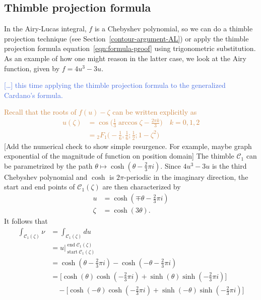 \documentclass{article}
\theoremstyle{definition}
\theoremstyle{plain}
\newenvironment{todo}{\color{Coral}}{\color{black}}
\newenvironment{old}{\color{RoyalBlue}}{\color{black}}
\begin{document}
\begin{old}
\subsection{Thimble projection formula}

In the Airy-Lucas integral, $f$ is a Chebyshev polynomial, so we can do a thimble projection technique (see Section~\ref{contour-argument-AL}) or apply the thimble projection formula equation~\eqref{eqn:formula-proof} using trigonometric substitution. As an example of how one might reason in the latter case, we look at the Airy function, given by $f = 4u^3-3u$.

\textcolor{RoyalBlue}{[\ldots] this time applying the thimble projection formula to the generalized Cardano's formula.}

\textcolor{Peru}{Recall that the roots of $f(u)-\zeta$ can be written explicitly as 
\begin{align*}
    u(\zeta)&=\cos\Big(\frac{1}{3}\arccos\zeta-\frac{2\pi k}{3}\Big) \quad k=0,1,2\\
    &={}_2F_1\Big(-\frac{1}{6},\frac{1}{6};\frac{1}{2};1-\zeta^2\Big)
\end{align*}}
\begin{todo}[Add the numerical check to show simple resurgence. For example, maybe graph exponential of the magnitude of function on position domain]\end{todo}
The thimble $\mathcal{C}_1$ can be parametrized by the path $\theta \mapsto \cosh(\theta - \tfrac{2}{3}\pi i)$. Since $4u^3 - 3u$ is the third Chebyshev polynomial and $\cosh$ is $2\pi$-periodic in the imaginary direction, the start and end points of $\mathcal{C}_1(\zeta)$ are then characterized by
\begin{align*}
u & = \cosh(\mp\theta - \tfrac{2}{3}\pi i) \\
\zeta & = \cosh(3\theta).
\end{align*}
It follows that
\begin{align*}
\int_{\mathcal{C}_1(\zeta)} \nu & = \int_{\mathcal{C}_1(\zeta)} du \\
& = u \Big|_{\operatorname{start} \mathcal{C}_1(\zeta)}^{\operatorname{end} \mathcal{C}_1(\zeta)}\\
 & = \cosh(\theta - \tfrac{2}{3}\pi i) - \cosh(-\theta - \tfrac{2}{3}\pi i) \\
& = \big[\cosh(\theta) \cosh(-\tfrac{2}{3}\pi i) + \sinh(\theta) \sinh(-\tfrac{2}{3}\pi i)\big] \\
& \quad - \big[\cosh(-\theta) \cosh(-\tfrac{2}{3}\pi i) + \sinh(-\theta) \sinh(-\tfrac{2}{3}\pi i)\big] \\

\end{align*}
\end{old}
\end{document}
